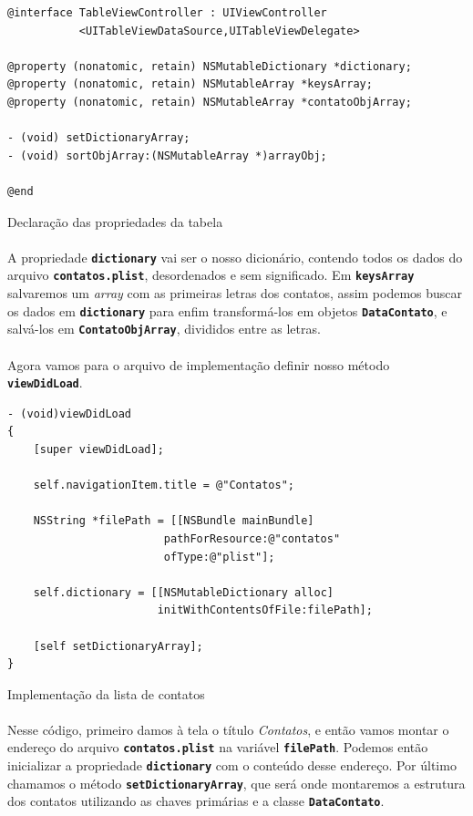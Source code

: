 \documentclass[a4paper,12pt,brazil,doubleside]{book}
\begin{document}
\begin{singlespace}
\begin{listing}[H]
\begin{verbatim}
@interface TableViewController : UIViewController 
           <UITableViewDataSource,UITableViewDelegate>

@property (nonatomic, retain) NSMutableDictionary *dictionary;
@property (nonatomic, retain) NSMutableArray *keysArray;
@property (nonatomic, retain) NSMutableArray *contatoObjArray;

- (void) setDictionaryArray;
- (void) sortObjArray:(NSMutableArray *)arrayObj;

@end
\end{verbatim}
\caption{Declaração das propriedades da tabela}
\end{listing}

\paragraph{}A propriedade \texttt{\textbf{dictionary}} vai ser o nosso dicionário, contendo todos os dados do arquivo \texttt{\textbf{contatos.plist}}, desordenados e sem significado. Em \texttt{\textbf{keysArray}} salvaremos um \emph{array} com as primeiras letras dos contatos, assim podemos buscar os dados em \texttt{\textbf{dictionary}} para enfim transformá-los em objetos \texttt{\textbf{DataContato}}, e salvá-los em \texttt{\textbf{ContatoObjArray}}, divididos entre as letras.
\paragraph{}Agora vamos para o arquivo de implementação definir nosso método \texttt{\textbf{viewDidLoad}}.

\begin{listing}[H]
\begin{verbatim}
- (void)viewDidLoad
{
    [super viewDidLoad];
    
    self.navigationItem.title = @"Contatos";
    
    NSString *filePath = [[NSBundle mainBundle]
    					pathForResource:@"contatos"
    					ofType:@"plist"];
    
    self.dictionary = [[NSMutableDictionary alloc]
    				   initWithContentsOfFile:filePath];
    
    [self setDictionaryArray];
}
\end{verbatim}
\caption{Implementação da lista de contatos}
\end{listing}

\paragraph{}Nesse código, primeiro damos à tela o título \emph{Contatos}, e então vamos montar o endereço do arquivo \texttt{\textbf{contatos.plist}} na variável \texttt{\textbf{filePath}}. Podemos então inicializar a propriedade \texttt{\textbf{dictionary}} com o conteúdo desse endereço. Por último chamamos o método \texttt{\textbf{setDictionaryArray}}, que será onde montaremos a estrutura dos contatos utilizando as chaves primárias e a classe \texttt{\textbf{DataContato}}.

\end{singlespace}
\end{document}
